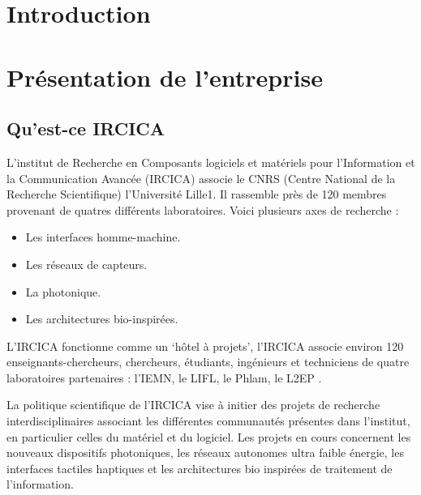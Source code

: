 \documentclass[a4paper]{article}
\begin{document}
\section{Introduction}

\section{Présentation de l'entreprise}

\subsection{Qu'est-ce IRCICA}
L'institut de Recherche en Composants logiciels et matériels pour l'Information et la Communication Avancée (IRCICA) associe le CNRS (Centre National de la Recherche Scientifique) l'Université Lille1. Il rassemble près de 120 membres provenant de quatres différents laboratoires. Voici plusieurs axes de recherche :



\begin{itemize}
\item Les interfaces homme-machine. 
\item Les réseaux de capteurs. 
\item La photonique. 
\item Les architectures bio-inspirées.
\end{itemize} 
     

L'IRCICA fonctionne comme un ‘hôtel à projets’, l’IRCICA associe environ 120 enseignants-chercheurs, chercheurs, étudiants, ingénieurs et techniciens de quatre laboratoires partenaires : l’IEMN, le LIFL, le Phlam, le L2EP .

La politique scientifique de l’IRCICA vise à initier des projets de recherche interdisciplinaires associant les différentes communautés présentes dans l’institut, en particulier celles du matériel et du logiciel.
Les projets en cours concernent les nouveaux dispositifs photoniques, les réseaux autonomes ultra faible énergie, les interfaces tactiles haptiques et les architectures bio inspirées de traitement de l’information.
\end{document}
